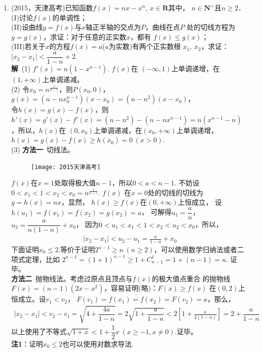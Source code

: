 \begin{enumerate}[label={【\textbf{例\thechapter.\arabic*}】},
 leftmargin=\inteval{\myenumleftmargin}pt,
 itemsep=\inteval{\myenumitempsep}pt,
 itemindent=\inteval{\myenumitemindent}pt]
\item (2015，天津高考)已知函数$ f(x)=nx-x^n,\ x\in \textbf{R} $其中，
$ n\in \textbf{N}^+ $且$ n\geq 2 $．\\
(I)讨论$ f(x) $的单调性；\\
(II)设曲线$ y=f(x) $与$ x $轴正半轴的交点为$ P $，曲线在点$ P $
处的切线方程为$ y=g(x) $，求证：对于任意的正实数$ x $，都有
$ f(x)\leq g(x) $；\\
(III)若关于$ x $的方程$ f(x)=a $($ a $为实数)有两个正实数根
$ x_1,\ x_2 $，求证：$ |x_2-x_1|<\dfrac{a}{1-n}+2 $. \\
\textbf{解}\ (1) $ f'(x)=n(1-x^{n-1}) $. $ f(x) $在
$ (-\infty,1) $上单调递增，在$ (1,+\infty) $上单调递减。\\
(2) 令$ x_0=n^{\frac{1}{n-1}} $，则$ P(x_0,0) $，
$ g(x)=(n-nx_0^{n-1})(x-x_0)=(n-n^2)(x-x_0) $，\\
令$ h(x)=g(x)-f(x) $，则$ h'(x)=g'(x)-f'(x)=(n-n^2)-
(n-nx^{n-1})=n(x^{n-1}-n) $，所以，$ h(x) $在
$ (0,x_0) $上单调递减，在$ (x_0,+\infty) $上单调递增，
$ h(x)=g(x)-f(x)\geq h(x_0)=0\ (x>0) $. \\
(3) \textbf{方法一}\ 切线法。
\begin{figure}[H]
    \centering
    \texttt{[image: 2015天津高考]}
\end{figure}
$ f(x) $在$ x=1 $处取得极大值$ n-1 $，所以$ 0<a<n-1 $.
不妨设$ 0<x_1<1<x_2<x_0=n^{\frac{1}{n-1}} $. $ f(x) $
在$ x=0 $处的切线的切线为$ y=h(x)=nx $，显然，
$ h(x)\geq f(x) $在$ (0,+\infty) $上恒成立，
设$ h(u_1)=f(x_1)=f(x_2)=g(x_2)=a $，
可解得$ u_1=\dfrac{a}{n} $，$ u_2=\dfrac{a}{n(1-n)}+x_0 $，
因为$ 0<u_1<x_1<1<x_2<u_2<x_0 $，所以，
\begin{gather*}
    |x_2-x_1|<u_2-u_1=\frac{a}{1-n}+x_0
\end{gather*}
下面证明$ x_0\leq 2 $.等价于证明$ 2^{n-1}\geq n\ 
(n\geq 2) $，可以使用数学归纳法或者二项式定理，比如
$ 2^{n-1}=(1+1)^{n-1}\geq 1+C_{n-1}^1=1+(n-1)=n $. 证毕。\\
\textbf{方法二}\ 抛物线法。考虑过原点且顶点与$ f(x) $的极大值点重合
的抛物线$ F(x)=(n-1)(2x-x^2) $，容易证明(略)：$ F(x)\geq f(x) $
在$ (0,2) $上恒成立。设$ v_1<v_2 $，
$ F(v_1)=f(x_1)=f(x_2)=F(v_2)=a $，那么，
\begin{gather*}
    |x_2-x_1|<v_2-v_1=\sqrt{4+\dfrac{4a}{1-n}}=
    2\sqrt{1+\dfrac{a}{1-n}}<2\left[1+\frac{a}{2(1-n)}\right]
    =2+\dfrac{a}{1-n}
\end{gather*}
以上使用了不等式$ \sqrt{1+x}<1+\dfrac{1}{2}x\ (x\geq -1,x\neq 0) $.证毕。\\
\textbf{注1}：证明$ x_0\leq 2 $也可以使用对数求导法. 

\end{enumerate}
